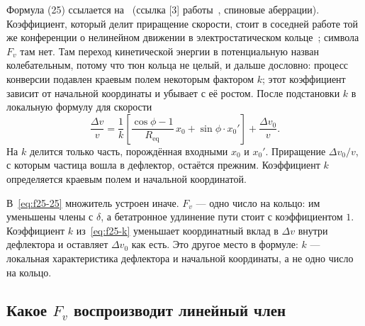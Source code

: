 Формула (25) ссылается на~\cite{Senichev2011} (ссылка [3] работы~\cite{Senichev2013}, спиновые аберрации). Коэффициент, который делит приращение скорости, стоит в соседней работе той же конференции о нелинейном движении в электростатическом кольце~\cite{Zyuzin2011}; символа $F_v$ там нет. Там переход кинетической энергии в потенциальную назван колебательным, потому что тюн кольца не целый, и дальше дословно: процесс конверсии подавлен краевым полем некоторым фактором $k$; этот коэффициент зависит от начальной координаты и убывает с её ростом. После подстановки $k$ в локальную формулу для скорости
\begin{equation}
\label{eq:f25-k}
\frac{\Delta v}{v}
=
\frac{1}{k}
\left[
\frac{\cos\phi-1}{R_{\mathrm{eq}}}\,x_0
+
\sin\phi\cdot x_0'
\right]
+
\frac{\Delta v_0}{v}.
\end{equation}
На $k$ делится только часть, порождённая входными $x_0$ и $x_0'$. Приращение $\Delta v_0/v$, с которым частица вошла в дефлектор, остаётся прежним. Коэффициент $k$ определяется краевым полем и начальной координатой.

В~\eqref{eq:f25-25} множитель устроен иначе. $F_v$ --- одно число на кольцо: им уменьшены члены с $\delta$, а бетатронное удлинение пути стоит с коэффициентом $1$. Коэффициент $k$ из~\eqref{eq:f25-k} уменьшает координатный вклад в $\Delta v$ внутри дефлектора и оставляет $\Delta v_0$ как есть. Это другое место в формуле: $k$ --- локальная характеристика дефлектора и начальной координаты, а не одно число на кольцо.

\subsection{Какое $F_v$ воспроизводит линейный член}
\label{sec:f25-lin}

